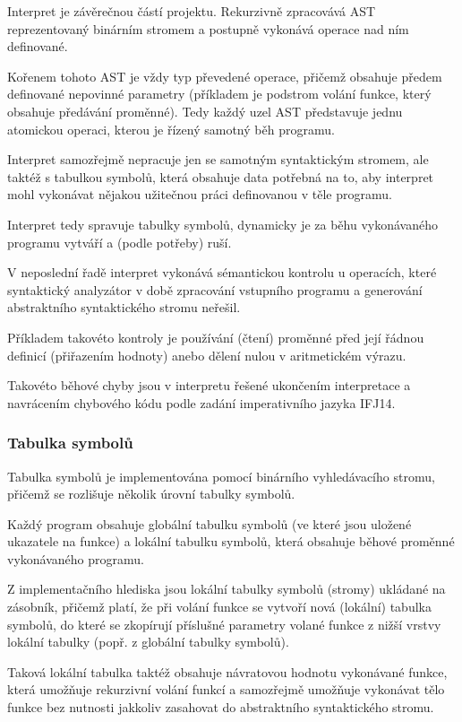 \documentclass[12pt,a4paper,titlepage,final]{article}
\begin{document}
Interpret je závěrečnou částí projektu. Rekurzivně zpracovává AST reprezentovaný
binárním stromem a postupně vykonává operace nad ním definované.

Kořenem tohoto AST je vždy typ převedené operace, přičemž obsahuje předem
definované nepovinné parametry (příkladem je podstrom volání funkce, který
obsahuje předávání proměnné). Tedy každý uzel AST představuje jednu atomickou
operaci, kterou je řízený samotný běh programu.

Interpret samozřejmě nepracuje jen se samotným syntaktickým stromem, ale
taktéž s tabulkou symbolů, která obsahuje data potřebná na to, aby interpret
mohl vykonávat nějakou užitečnou práci definovanou v těle programu.

Interpret tedy spravuje tabulky symbolů, dynamicky je za běhu
vykonávaného programu vytváří a (podle potřeby) ruší.

V neposlední řadě interpret vykonává sémantickou kontrolu u operacích, které
syntaktický analyzátor v době zpracování vstupního programu a generování
abstraktního syntaktického stromu neřešil.

Příkladem takovéto kontroly je používání (čtení) proměnné před její řádnou
definicí (přiřazením hodnoty) anebo dělení nulou v aritmetickém výrazu.

Takovéto běhové chyby jsou v interpretu řešené ukončením interpretace a navrácením
chybového kódu podle zadání imperativního jazyka IFJ14.

\subsubsection{Tabulka symbolů} \label{tabulka_symbolu}

Tabulka symbolů je implementována pomocí binárního vyhledávacího stromu,
přičemž se rozlišuje několik úrovní tabulky symbolů.

Každý program obsahuje globální tabulku symbolů (ve které jsou uložené ukazatele
na funkce) a lokální tabulku symbolů, která obsahuje běhové proměnné
vykonávaného programu.

Z implementačního hlediska jsou lokální tabulky symbolů (stromy) ukládané na
zásobník, přičemž platí, že při volání funkce se vytvoří nová (lokální)
tabulka symbolů, do které se zkopírují příslušné parametry volané funkce z
nižší vrstvy lokální tabulky (popř. z globální tabulky symbolů).

Taková lokální tabulka taktéž obsahuje návratovou hodnotu vykonávané funkce,
která umožňuje rekurzivní volání funkcí a samozřejmě umožňuje vykonávat tělo
funkce bez nutnosti jakkoliv zasahovat do abstraktního syntaktického stromu.
\end{document}
